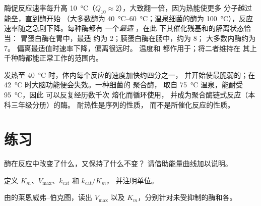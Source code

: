 \begin{proposition}[酶及其环境]\label{prop:b1:enzymes:environment}
酶促反应速率每升高
\qty{10}{\celsius}（$Q_{10} \approx 2$），大致翻一倍，因为热能使更多
分子越过能垒，直到酶开始
（大多数酶为 \qtyrange{40}{60}{\celsius}；温泉细菌的酶为
\qty{100}{\celsius}），反应速率随之急剧下降。每种酶都有
一个\emph{最适 }，在此  下其催化残基和的解离状态恰当：
胃蛋白酶在胃中，最适  约为 2；胰蛋白酶在肠中，约为 8；
大多数内酶约为 7。
偏离最适值时速率下降，偏离很远时。
温度和  都作用于；将二者维持在
其上千种酶都能正常工作的范围内。
\end{proposition}

\begin{example}[发热与温泉]\label{ex:b1:enzymes:fever}
发热至 \qty{40}{\celsius} 时，体内每个反应的速度加快约四分之一，
并开始使最脆弱的；在
\qty{42}{\celsius} 时大脑功能便会失效。一种细菌的  聚合酶，
取自 \qty{75}{\celsius} 温泉，能耐受 \qty{95}{\celsius}，因此
可以反复经历数千次  熔化而循环使用，
并成为聚合酶链式反应（本科三年级分册）的酶。
耐热性是序列的性质，
而不是所催化反应的性质。
\end{example}

\section{练习}

\begin{exercise}[$\star$]\label{exo:b1:enzymes:1}
酶在反应中改变了什么，又保持了什么不变？
请借助能量曲线加以说明。
\end{exercise}

\begin{exercise}[$\star$]\label{exo:b1:enzymes:2}
定义 $K_m$、$V_{\max}$、$k_{\text{cat}}$ 和 $k_{\text{cat}}/K_m$，
并注明单位。
\end{exercise}

\begin{exercise}[$\star$]\label{exo:b1:enzymes:3}
由的莱恩威弗–伯克图，读出 $V_{\max}$
以及 $K_m$，分别针对未受抑制的酶和各。
\end{exercise}

